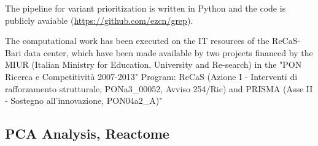 The \gp pipeline for variant prioritization is written in Python and the code is publicly avaiable (\url{https://github.com/ezcn/grep}). 
 
The computational work has been executed on the IT resources of the ReCaS-Bari data center, which have been made available by two projects financed by the MIUR (Italian Ministry for Education, University and Re-search) in the "PON Ricerca e Competitività 2007-2013" Program: ReCaS (Azione I - Interventi di rafforzamento strutturale, PONa3\_00052, Avviso 254/Ric) and PRISMA (Asse II - Sostegno all'innovazione, PON04a2\_A)"




\subsection*{PCA Analysis, Reactome} 


